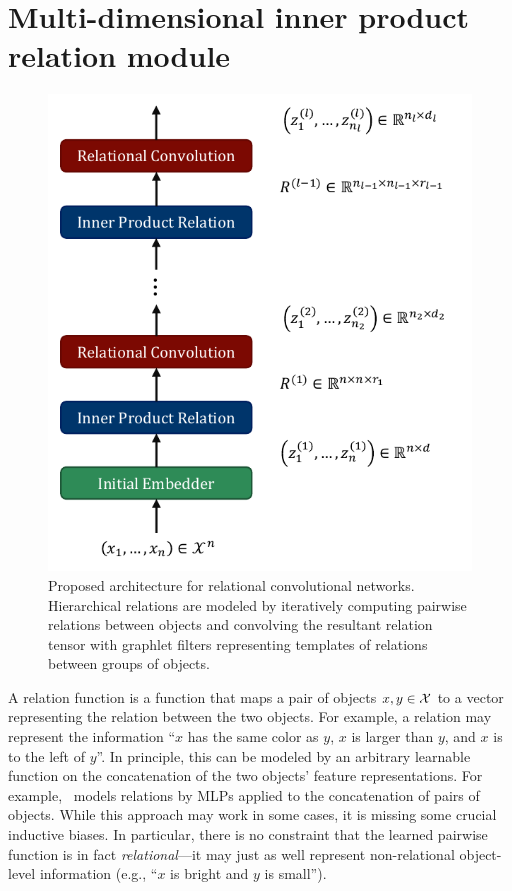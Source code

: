 \section{Multi-dimensional inner product relation module}\label{sec:mdipr}

\begin{figure}[t]
    \centering
    \includegraphics[width=.45\textwidth]{figs/relconv_architecture.pdf}
    \vskip-12pt
    \caption{Proposed architecture for relational convolutional networks. Hierarchical relations are modeled by iteratively computing pairwise relations between objects and convolving the resultant relation tensor with graphlet filters representing templates of relations between groups of objects.
    }\label{fig:relconv_architecture}
    \vskip-12pt
\end{figure}

A relation function is a function that maps a pair of objects $x, y \in {\mathcal{X}}$ to a vector representing the relation between the two objects. For example, a relation may represent the information ``$x$ has the same color as $y$, $x$ is larger than $y$, and $x$ is to the left of $y$''. In principle, this can be modeled by an arbitrary learnable function on the concatenation of the two objects' feature representations. For example,~\citep{santoroSimpleNeural2017} models relations by MLPs applied to the concatenation of pairs of objects. While this approach may work in some cases, it is missing some crucial inductive biases. In particular, there is no constraint that the learned pairwise function is in fact \textit{relational}---it may just as well represent non-relational object-level information (e.g., ``$x$ is bright and $y$ is small'').%

